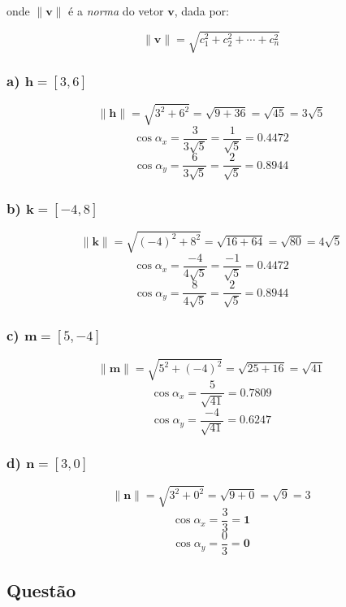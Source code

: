 \documentclass[a4paper,11pt,pagenumber=true]{article}
\newcommand{\vecv}{$\mathbf{v}$}
\newcommand{\vecnorm}[1]{\|\mathbf{#1}\|}
\theoremstyle{mytheor}
\begin{document}
            onde $\vecnorm{v}$ é a \textit{norma} do vetor \vecv, dada por:
            
            \begin{equation}\label{eq_norm}
                \vecnorm{v} = \sqrt{c_1^2 + c_2^2 + \dotsb + c_n^2}
            \end{equation}
            
            \subsubsection*{a) $\mathbf{h} = [3, 6]$}
            \[ \vecnorm{h} = \sqrt{3^2 + 6^2} = \sqrt{9 + 36} = \sqrt{45} = 3 \sqrt{5} \]
            \[ \cos \alpha_x = \frac{3}{3 \sqrt{5}} = \frac{1}{\sqrt{5}} = \mathbf{0.4472} \]
            \[ \cos \alpha_y = \frac{6}{3 \sqrt{5}} = \frac{2}{\sqrt{5}} = \mathbf{0.8944} \]
            
            \subsubsection*{b) $\mathbf{k} = [-4, 8]$}
            \[ \vecnorm{k} = \sqrt{(-4)^2 + 8^2} = \sqrt{16 + 64} = \sqrt{80} = 4 \sqrt{5} \]
            \[ \cos \alpha_x = \frac{-4}{4 \sqrt{5}} = \frac{-1}{\sqrt{5}} = \mathbf{0.4472} \]
            \[ \cos \alpha_y = \frac{8}{4 \sqrt{5}} = \frac{2}{\sqrt{5}} = \mathbf{0.8944} \]

            \subsubsection*{c) $\mathbf{m} = [5, -4]$}
            \[ \vecnorm{m} = \sqrt{5^2 + (-4)^2} = \sqrt{25 + 16} = \sqrt{41} \]
            \[ \cos \alpha_x = \frac{5}{\sqrt{41}} = \mathbf{0.7809} \]
            \[ \cos \alpha_y = \frac{-4}{\sqrt{41}} = \mathbf{0.6247} \]

            \subsubsection*{d) $\mathbf{n} = [3, 0]$}
            \[ \vecnorm{n} = \sqrt{3^2 + 0^2} = \sqrt{9 + 0} = \sqrt{9} = 3\]
            \[ \cos \alpha_x = \frac{3}{3} = \mathbf{1} \]
            \[ \cos \alpha_y = \frac{0}{3} = \mathbf{0} \]
                
        \clearpage
        
        \subsection{Questão }
        
\end{document}
